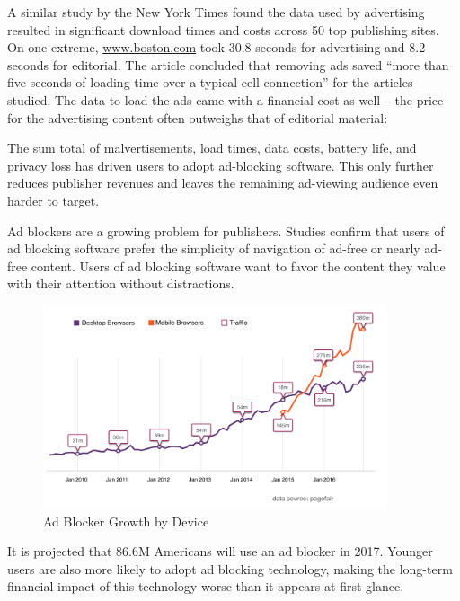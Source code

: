 \documentclass[11pt]{article}
\begin{document}
A similar study by the New York Times found the data used by advertising resulted in significant  download times and costs across 50 top publishing sites. On one extreme, \href{https://www.boston.com}{www.boston.com} took 30.8 seconds for advertising and 8.2 seconds for editorial. The article concluded that removing ads saved “more than five seconds of loading time over a typical cell connection” for the articles studied. The data to load the ads came with a financial cost as well -- the price for the advertising content often outweighs that of editorial material:

The sum total of malvertisements, load times, data costs, battery life, and privacy loss has driven users to adopt ad-blocking software. This only further reduces publisher revenues and leaves the remaining ad-viewing audience even harder to target.

Ad blockers are a growing problem for publishers. Studies confirm that users of ad blocking software prefer the simplicity of navigation of ad-free or nearly ad-free content. Users of ad blocking software want to favor the content they value with their attention without distractions.  


\begin{figure}
\begin{center}
\includegraphics[width=0.9\textwidth]{adblock_growth_by_device.png}
\caption{Ad Blocker Growth by Device}
\end{center}
\end{figure}

It is projected that 86.6M Americans will use an ad blocker in 2017\cite{10}. Younger users are also more likely to adopt ad blocking technology, making the long-term financial impact of this technology worse than it appears at first glance\cite{11}.
\end{document}
